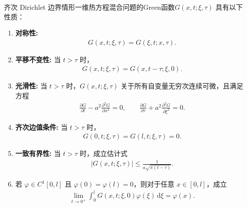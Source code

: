 \documentclass[../../main.tex]{subfiles}%
\begin{document}
\begin{proposition}\label{proposition:齐次 Dirichlet 边界情形一维热方程Green函数的性质}
齐次 Dirichlet 边界情形一维热方程混合问题的Green函数$G(x,t;\xi,\tau)$ 具有以下性质：
\begin{enumerate}[(1)]
\item \textbf{对称性:}
\begin{align*}
G(x,t;\xi,\tau)=G(\xi,t;x,\tau).
\end{align*}

\item \textbf{平移不变性:} 当 $t>\tau$ 时，
\begin{align*}
G(x,t;\xi,\tau)=G(x,t-\tau;\xi,0).
\end{align*}

\item \textbf{光滑性:} 当 $t>\tau$ 时，$G(x,t;\xi,\tau)$ 关于所有自变量无穷次连续可微，且满足方程
\begin{align*}
\frac{\partial G}{\partial t}-a^2\frac{\partial^2 G}{\partial x^2}=0,\qquad 
\frac{\partial G}{\partial\tau}+a^2\frac{\partial^2 G}{\partial\xi^2}=0.
\end{align*}

\item \textbf{齐次边值条件:} 当 $t>\tau$ 时，
\begin{align*}
G(0,t;\xi,\tau)=G(l,t;\xi,\tau)=0.
\end{align*}

\item \textbf{一致有界性:} 当 $t>\tau$ 时，成立估计式
\begin{align*}
|G(x,t;\xi,\tau)|\leqslant \frac{1}{a\sqrt{\pi(t-\tau)}}.
\end{align*}

\item 若 $\varphi\in C^1[0,l]$ 且 $\varphi(0)=\varphi(l)=0$，则对于任意 $x\in[0,l]$，成立
\begin{align*}
\lim_{t\to 0^+}\int_0^l G(x,t;\xi,0)\varphi(\xi)\,\mathrm{d}\xi=\varphi(x).
\end{align*}
\end{enumerate}
\end{proposition}
\end{document}
